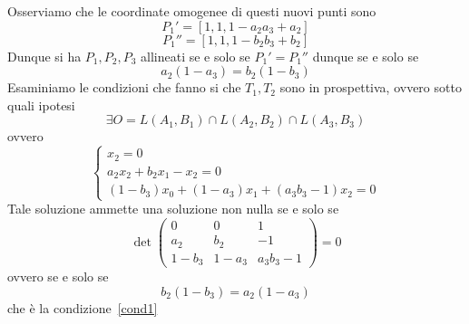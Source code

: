 \begin{thm}[di Desagues]
\begin{itemize}
\end{itemize}
Osserviamo che le coordinate omogenee di questi nuovi punti sono 
$$ P_1'= [1,1,1-a_2a_3+a_2]$$
$$P_1''=[1,1,1-b_2b_3+b_2]$$
Dunque si ha $P_1,P_2,P_3$ allineati se e solo se $P_1'=P_1''$ dunque se e solo se
\begin{equation}
\label{cond1}
a_2(1-a_3) = b_2(1-b_3)
\end{equation}
Esaminiamo le condizioni che fanno si che $T_1,T_2$ sono in prospettiva, ovvero sotto quali ipotesi 
$$\exists O=L(A_1,B_1) \cap L(A_2,B_2) \cap L(A_3,B_3)$$
ovvero 
$$ \begin{cases} x_2=0\\
a_2 x_2+ b_2 x_1-x_2 =0\\
(1-b_3) x_0 + (1-a_3) x_1 + (a_3b_3-1) x_2=0
\end{cases}$$
Tale soluzione ammette una soluzione non nulla se e solo se 
$$\det \begin{pmatrix}
0 & 0 & 1 \\
a_2 & b_2 & -1 \\
1-b_3 & 1-a_3 & a_3b_3-1
\end{pmatrix}=0$$
ovvero se e solo se 
$$b_2(1-b_3) = a_2(1-a_3)$$
che \`e la condizione~\ref{cond1}
\endproof
\end{thm}


